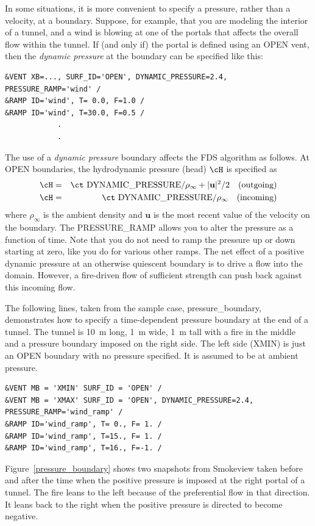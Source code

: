 \documentclass[11pt]{book}
\begin{document}
In some situations, it is more convenient to specify a pressure, rather than a velocity, at a boundary. Suppose, for example, that you are modeling the
interior of a tunnel, and a wind is blowing at one of the portals that affects the overall flow within the tunnel. If (and only if) the portal is defined using an {\ct OPEN} vent, then the {\em dynamic pressure} at the boundary can be specified like this:
\begin{lstlisting}
&VENT XB=..., SURF_ID='OPEN', DYNAMIC_PRESSURE=2.4, PRESSURE_RAMP='wind' /
&RAMP ID='wind', T= 0.0, F=1.0 /
&RAMP ID='wind', T=30.0, F=0.5 /
            .
            .
\end{lstlisting}
The use of a {\em dynamic pressure} boundary affects the FDS algorithm as follows.  At {\ct OPEN} boundaries, the hydrodynamic pressure (head) $\cH$ is specified as
\begin{eqnarray}
\cH &=& \mbox{\ct DYNAMIC\_PRESSURE}/\rho_\infty + {|\mathbf{u}|^2}/2 \quad  \mbox{(outgoing)}  \nonumber \\
\cH &=& \mbox{\ct DYNAMIC\_PRESSURE}/\rho_\infty \quad                       \mbox{(incoming)}
\end{eqnarray}
where $\rho_\infty$ is the ambient density and $\mathbf{u}$ is the most recent value of the velocity on the boundary.
The {\ct PRESSURE\_RAMP} allows you to alter the pressure as a function of time. Note that you do not
need to ramp the pressure up or down starting at zero, like you do for various other ramps.
The net effect of a positive dynamic pressure at an otherwise quiescent boundary is to
drive a flow into the domain. However, a fire-driven flow of sufficient strength can push back against this incoming flow.

The following lines, taken from the sample case, {\ct pressure\_boundary}, demonstrates how to specify
a time-dependent pressure boundary at the end of a tunnel. The tunnel is 10~m long, 1~m wide, 1~m tall
with a fire in the middle and a pressure boundary imposed on the right side. The left side ({\ct XMIN}) is
just an {\ct OPEN} boundary with no pressure specified. It is assumed to be at ambient pressure.
\begin{lstlisting}
&VENT MB = 'XMIN' SURF_ID = 'OPEN' /
&VENT MB = 'XMAX' SURF_ID = 'OPEN', DYNAMIC_PRESSURE=2.4, PRESSURE_RAMP='wind_ramp' /
&RAMP ID='wind_ramp', T= 0., F= 1. /
&RAMP ID='wind_ramp', T=15., F= 1. /
&RAMP ID='wind_ramp', T=16., F=-1. /
\end{lstlisting}
Figure~\ref{pressure_boundary} shows two snapshots from Smokeview taken before and after the time when the positive pressure is imposed at the right portal of a tunnel. The fire leans to the left because of the preferential flow in that direction. It leans back to the right when the positive pressure is directed to become negative.
\end{document}
